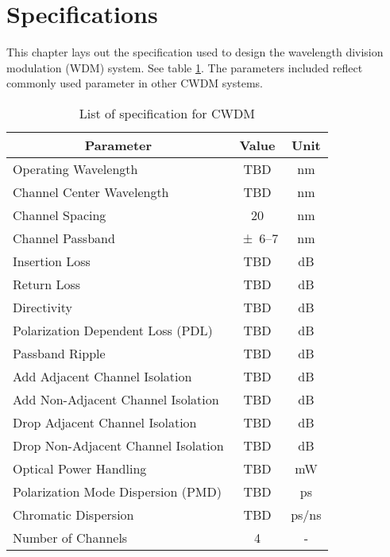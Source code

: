 \section{Specifications}
\label{sec:specifications}
This chapter lays out the specification used to design the wavelength division modulation (WDM) system. See table \ref{table:specs}. The parameters included reflect commonly used parameter in other CWDM systems\cite{noauthor_gofoton_nodate-1}\cite{noauthor_4ch_nodate}\cite{noauthor_cisco_nodate-2}.

\begin{table}[!ht]
	\centering
	\begin{tabular}{|l|c|c|}
		\hline
		\multicolumn{1}{|c|}{\textbf{Parameter}} & \textbf{Value} & \textbf{Unit} \\ \hline
		Operating Wavelength & TBD & \unit{\nm} \\ \hline
		Channel Center Wavelength & TBD & \unit{\nm} \\ \hline
		Channel Spacing & 20\cite{noauthor_g6942_2003} & \unit{\nm} \\ \hline
		Channel Passband & \numrange[range-phrase=-]{\pm 6}{7}\cite{noauthor_g6942_2003} & \unit{\nm} \\ \hline
		Insertion Loss & TBD & \unit{\dB} \\ \hline
		Return Loss & TBD & \unit{\dB} \\ \hline
		Directivity & TBD & \unit{\dB} \\ \hline
		Polarization Dependent Loss (PDL) & TBD & \unit{\dB} \\ \hline
		Passband Ripple & TBD & \unit{\dB} \\ \hline
		Add Adjacent Channel Isolation & TBD & \unit{\dB} \\ \hline
		Add Non-Adjacent Channel Isolation & TBD & \unit{\dB} \\ \hline
		Drop Adjacent Channel Isolation & TBD & \unit{\dB} \\ \hline
		Drop Non-Adjacent Channel Isolation & TBD & \unit{\dB} \\ \hline
		Optical Power Handling & TBD & \unit{\mW} \\ \hline
		Polarization Mode Dispersion (PMD) & TBD & \unit{\ps} \\ \hline
		Chromatic Dispersion & TBD & \unit{\ps/\ns} \\ \hline
		Number of Channels & 4 & - \\ \hline
	\end{tabular}
	\caption{List of specification for CWDM}
	\label{table:specs}
\end{table}

